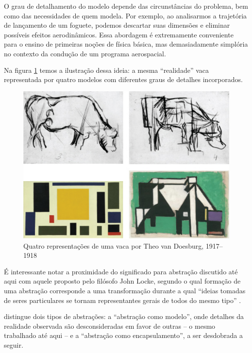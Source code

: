 O grau de detalhamento do modelo depende das circunstâncias do problema, bem como das necessidades de quem modela. Por exemplo, ao analisarmos a trajetória de lançamento de um foguete, podemos descartar suas dimensões e eliminar possíveis efeitos aerodinâmicos. Essa abordagem é extremamente conveniente para o ensino de primeiras noções de física básica, mas demasiadamente simplória no contexto da condução de um programa aerospacial.

Na figura \ref{fig:cows} temos a ilustração dessa ideia: a mesma ``realidade'' vaca representada por quatro modelos com diferentes graus de detalhes incorporados.

\begin{figure}[htb]
	\caption{Quatro representações de uma vaca por Theo van Doesburg, 1917--1918}
	\begin{center}
	    \includegraphics[scale=0.26]{imagens/vacas.png}
	\end{center}
	\label{fig:cows}
\end{figure}

É interessante notar a proximidade do significado para abstração discutido até aqui com aquele proposto pelo filósofo John Locke, segundo o qual formação de uma abstração corresponde a uma transformação durante a qual ``ideias tomadas de seres particulares se tornam representantes gerais de todos do mesmo tipo'' .

 distingue dois tipos de abstrações: a ``abstração como modelo'', onde detalhes da realidade observada são desconsideradas em favor de outras -- o mesmo trabalhado até aqui -- e a ``abstração como encapsulamento'', a ser desdobrada a seguir. 

